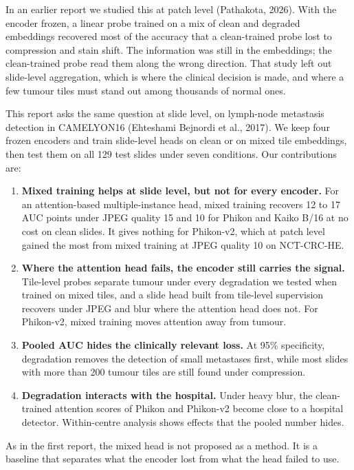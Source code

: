 \documentclass[11pt,a4paper]{article}
\begin{document}
In an earlier report we studied this at patch level (Pathakota, 2026). With the encoder frozen, a linear probe trained on a mix of clean and degraded embeddings recovered most of the accuracy that a clean-trained probe lost to compression and stain shift. The information was still in the embeddings; the clean-trained probe read them along the wrong direction. That study left out slide-level aggregation, which is where the clinical decision is made, and where a few tumour tiles must stand out among thousands of normal ones.

This report asks the same question at slide level, on lymph-node metastasis detection in CAMELYON16 (Ehteshami Bejnordi et al., 2017). We keep four frozen encoders and train slide-level heads on clean or on mixed tile embeddings, then test them on all 129 test slides under seven conditions. Our contributions are:

\begin{enumerate}
\item \textbf{Mixed training helps at slide level, but not for every encoder.} For an attention-based multiple-instance head, mixed training recovers 12 to 17 AUC points under JPEG quality 15 and 10 for Phikon and Kaiko B/16 at no cost on clean slides. It gives nothing for Phikon-v2, which at patch level gained the most from mixed training at JPEG quality 10 on NCT-CRC-HE.
\item \textbf{Where the attention head fails, the encoder still carries the signal.} Tile-level probes separate tumour under every degradation we tested when trained on mixed tiles, and a slide head built from tile-level supervision recovers under JPEG and blur where the attention head does not. For Phikon-v2, mixed training moves attention away from tumour.
\item \textbf{Pooled AUC hides the clinically relevant loss.} At 95\% specificity, degradation removes the detection of small metastases first, while most slides with more than 200 tumour tiles are still found under compression.
\item \textbf{Degradation interacts with the hospital.} Under heavy blur, the clean-trained attention scores of Phikon and Phikon-v2 become close to a hospital detector. Within-centre analysis shows effects that the pooled number hides.
\end{enumerate}

As in the first report, the mixed head is not proposed as a method. It is a baseline that separates what the encoder lost from what the head failed to use.
\end{document}
